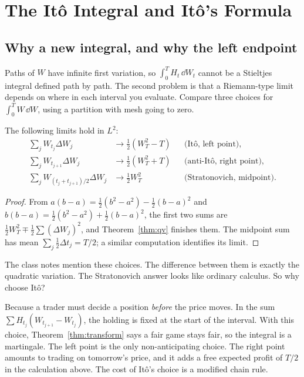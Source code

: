 \chapter{The It\^o Integral and It\^o's Formula}\label{ch:ito}

\section{Why a new integral, and why the left endpoint}

Paths of $W$ have infinite first variation, so $\int_0^TH_t\,\dd W_t$ cannot be a Stieltjes integral defined path by path. The second problem is that a Riemann-type limit depends on where in each interval you evaluate. Compare three choices for $\int_0^TW\,\dd W$, using a partition with mesh going to zero.

\begin{proposition}\label{prop:threechoices}
The following limits hold in $L^2$:
\begin{align*}
\sum_jW_{t_j}\Delta W_j&\to\tfrac12(W_T^2-T)&&\text{(It\^o, left point)},\\
\sum_jW_{t_{j+1}}\Delta W_j&\to\tfrac12(W_T^2+T)&&\text{(anti-It\^o, right point)},\\
\sum_jW_{(t_j+t_{j+1})/2}\Delta W_j&\to\tfrac12W_T^2&&\text{(Stratonovich, midpoint)}.
\end{align*}
\end{proposition}
\begin{proof}
From $a(b-a)=\tfrac12(b^2-a^2)-\tfrac12(b-a)^2$ and $b(b-a)=\tfrac12(b^2-a^2)+\tfrac12(b-a)^2$, the first two sums are $\tfrac12W_T^2\mp\tfrac12\sum(\Delta W_j)^2$, and Theorem~\ref{thm:qv} finishes them. The midpoint sum has mean $\sum_j\tfrac12\Delta t_j=T/2$; a similar computation identifies its limit.
\end{proof}

The class notes mention these choices. The difference between them is exactly the quadratic variation. The Stratonovich answer looks like ordinary calculus. So why choose Itô?

\begin{intuition}
Because a trader must decide a position \emph{before} the price moves. In the sum $\sum H_{t_j}(W_{t_{j+1}}-W_{t_j})$, the holding is fixed at the start of the interval. With this choice, Theorem~\ref{thm:transform} says a fair game stays fair, so the integral is a martingale. The left point is the only non-anticipating choice. The right point amounts to trading on tomorrow's price, and it adds a free expected profit of $T/2$ in the calculation above. The cost of Itô's choice is a modified chain rule.
\end{intuition}

